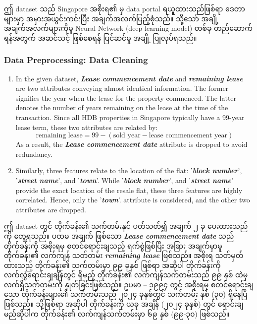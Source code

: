 \noindent ဤ dataset သည် Singapore အစိုးရ၏ မှ data portal ရယူထားသည်ဖြစ်ရာ ဒေတာများမှာ အမှားအယွင်းကင်းပြီး အချက်အလက်ပြည့်စုံသည်။ သို့သော် အချို့ အချက်အလက်များကိုမူ Neural Network (deep learning model) တစ်ခု တည်ဆောက်ရန်အတွက် အဆင်သင့် ဖြစ်စေရန် ပြင်ဆင်မှု အချို့ ပြုလုပ်ရသည်။ 

\subsubsection{Data Preprocessing: Data Cleaning}
\begin{enumerate}
    \item In the given dataset, \textit{\textbf{Lease commencement date}} and \textit{\textbf{remaining lease}} are two attributes conveying almost identical information. The former signifies the year when the lease for the property commenced. The latter denotes the number of years remaining on the lease at the time of the transaction. Since all HDB properties in Singapore typically have a 99-year lease term, these two attributes are related by:
        \begin{equation}\label{eqn:lease_relation}
           \text{remaining lease} = 99 - (\text{sold year} - \text{lease commencement year})
        \end{equation} As a result, the \textit{\textbf{Lease commencement date}} attribute is dropped to avoid redundancy.
        
    \item Similarly, three features relate to the location of the flat: '\textbf{\textit{block number}}', '\textit{\textbf{street name}}', and '\textit{\textbf{town}}'. While '\textbf{\textit{block number}}', and '\textit{\textbf{street name}}' provide the exact location of the resale flat, these three features are highly correlated. Hence, only the '\textit{\textbf{town}}'. attribute is considered, and the other two attributes are dropped.
\end{enumerate}

ဤ dataset တွင် တိုက်ခန်း၏ သက်တမ်းနှင့် ပတ်သတ်၍ အချက် ၂ ခု ပေးထားသည်ကို တွေ့ရသည်။ ပထမ အချက် ဖြစ်သော  \textit{\textbf{Lease commencement date}} သည် တိုက်ခန်းကို အစိုးရမှ စတင်ရောင်းချသည့် ရက်စွဲဖြစ်ပြီး အခြား အချက်မှာမူ တိုက်ခန်း၏ လက်ကျန် သတ်တမ်း \textit{\textbf{remaining lease}} ဖြစ်သည်။  အစိုးရ သတ်မှတ်ထားသည့် တိုက်ခန်း၏ သက်တမ်းမှာ ၉၉ ခုနှစ် ဖြစ်ရာ အဆိုပါ တိုက်ခန်းကို လက်လွှဲရောင်းချချိန်တွင် ရှိမည့် တိုက်ခန်း၏ လက်ကျန်သက်တမ်းသည် ၉၉ နှစ် ထဲမှ လက်ရှိသက်တမ်းကို နှုတ်ခြင်းဖြစ်သည်။   ဥပမာ -- ၁၉၉၄ တွင် အစိုးရမှ စတင်ရောင်းချသော တိုက်ခန်းများ၏ သက်တမ်းသည် ၂၀၂၄ ခုနှစ်တွင် သက်တမ်း နှစ် (၃၀) ရှိနေပြီ ဖြစ်သည်။ သို့ဖြစ်ရာ အဆိုပါ တိုက်ခန်းကို ယခု အချိန် (၂၀၂၄ ခုနှစ်) တွင် ရောင်းချမည်ဆိုပါက တိုက်ခန်း၏ လက်ကျန်သက်တမ်းမှာ ၆၉ နှစ် (၉၉-၃၀)  ဖြစ်သည်။ 


